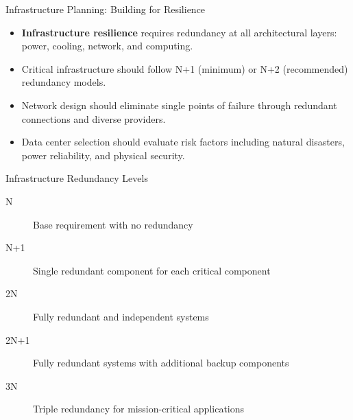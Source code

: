 \documentclass{beamer}
\begin{document}
\begin{frame}{Infrastructure Planning: Building for Resilience}
    \begin{itemize}
        \item \textbf{Infrastructure resilience} requires redundancy at all architectural layers: power, cooling, network, and computing.
        \item Critical infrastructure should follow N+1 (minimum) or N+2 (recommended) redundancy models.
        \item Network design should eliminate single points of failure through redundant connections and diverse providers.
        \item Data center selection should evaluate risk factors including natural disasters, power reliability, and physical security.
    \end{itemize}
    
    \begin{block}{Infrastructure Redundancy Levels}
        \scriptsize
        \begin{description}
            \item[N] Base requirement with no redundancy
            \item[N+1] Single redundant component for each critical component
            \item[2N] Fully redundant and independent systems
            \item[2N+1] Fully redundant systems with additional backup components
            \item[3N] Triple redundancy for mission-critical applications
        \end{description}
    \end{block}
\end{frame}
\end{document}
